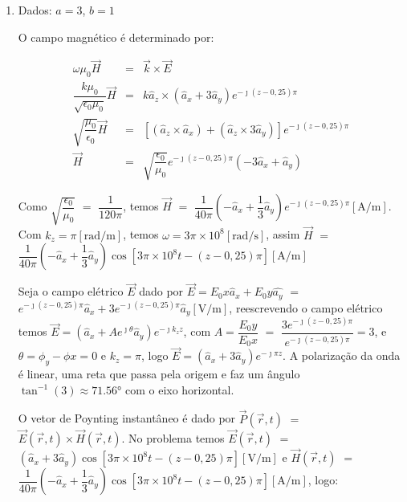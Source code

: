 \begin{enumerate}[1.]

\item Dados: $a = 3$, $b = 1$

O campo magnético é determinado por:

\begin{eqnarray*}
  \omega \mu_{0} \vec{H} & = &  \vec{k} \times \vec{E} \nonumber \\
  \dfrac{k \mu_{0}}{\sqrt{\epsilon_{0}\mu_{0}}} \vec{H} & = & k\hat{a}_{z} \times (\hat{a}_{x} + 3\hat{a}_{y})e^{-\jmath (z - 0,25)\pi} \nonumber \\
  \sqrt{\dfrac{\mu_{0}}{\epsilon_{0}}} \vec{H} & = & \left[ (\hat{a}_{z} \times \hat{a}_{x}) + (\hat{a}_{z} \times 3\hat{a}_{y}) \right]e^{-\jmath (z - 0,25)\pi} \nonumber \\
  \vec{H} & = & \sqrt{\dfrac{\epsilon_{0}}{\mu_{0}}}e^{-\jmath (z - 0,25)\pi}\left(-3\hat{a}_{x} + \hat{a}_{y}\right) \nonumber
\end{eqnarray*}

Como $\sqrt{\dfrac{\epsilon_{0}}{\mu_{0}}}$ $=$ $\dfrac{1}{120\pi}$, temos $\vec{H}$ $=$ $\dfrac{1}{40\pi}\left(-\hat{a}_{x} + \dfrac{1}{3}\hat{a}_{y}\right)e^{-\jmath (z - 0,25)\pi} [\si{\ampere/\meter}]$. Com $k_{z} = \pi [\si{\radian/\meter}]$, temos $\omega = 3\pi \times 10^{8} [\si{\radian/\second}]$, assim $\vec{H}$ $=$ $\dfrac{1}{40\pi}\left(-\hat{a}_{x} + \dfrac{1}{3}\hat{a}_{y}\right)\cos[3\pi \times 10^{8}t - (z - 0,25)\pi] [\si{\ampere/\meter}]$

Seja o campo elétrico $\vec{E}$ dado por $\vec{E} = E_{0}x \hat{a}_{x} + E_{0}y \hat{ a_{y}}$  $=$ $e^{-\jmath (z - 0,25) \pi} \hat{a}_{x} + 3 e^{-\jmath (z - 0,25)\pi} \hat{a}_{y} [\si{\volt/\meter}]$, reescrevendo o campo elétrico temos $\vec{E} = (\hat{a}_{x} + A e^{\jmath \theta} \hat{a}_{y})e^{-\jmath k_{z} z}$, com $A = \dfrac{E_{0}y}{E_{0}x}$ $=$ $\dfrac{3 e^{-\jmath (z - 0,25)\pi}}{e^{-\jmath (z - 0,25) \pi}} = 3$, e $\theta = \phi_{y} - \phi{x}  = 0$ e $k_{z} = \pi$, logo $\vec{E} = (\hat{a}_{x} + 3 \hat{a}_{y})e^{-\jmath \pi z}$. A polarização da onda é linear, uma reta que passa pela origem e faz um ângulo $\tan^{-1}(3) \approx 71.56\si{\degree}$ com o eixo horizontal.

O vetor de Poynting instantâneo é dado por $\vec{P}(\vec{r},t)$ $=$ $\vec{E}(\vec{r},t) \times \vec{H}(\vec{r},t)$. No problema temos $\vec{E}(\vec{r},t)$ $=$ $\left(\hat{a}_{x} + 3\hat{a}_{y}\right)\cos[3\pi \times 10^{8}t - (z - 0,25)\pi] [\si{\volt/\meter}]$ e $\vec{H}(\vec{r},t)$ $=$ $\dfrac{1}{40\pi}\left(-\hat{a}_{x} + \dfrac{1}{3}\hat{a}_{y}\right)\cos[3\pi \times 10^{8}t - (z - 0,25)\pi] [\si{\ampere/\meter}]$, logo:


\end{enumerate}
